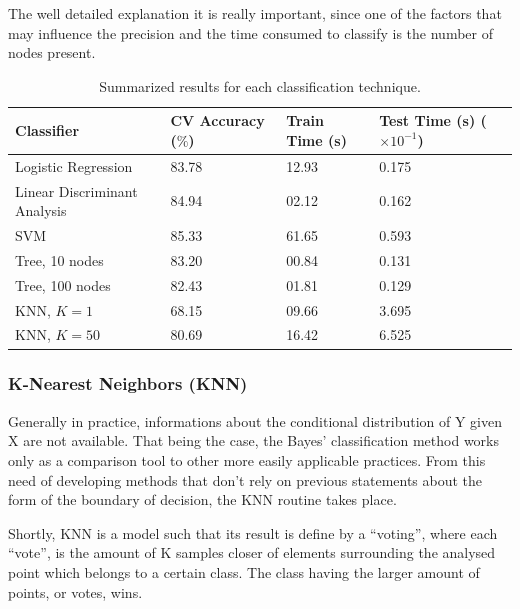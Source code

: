 The well detailed explanation it is really important, since one of the factors that may 
influence the precision and the time consumed to classify is the number of nodes present.

\begin{table}[!htbp]
    \caption{Summarized results for each classification technique.}
    \begin{center}
    \begin{tabular}{|l|l|l|l|l|}
            \hline 
            Classifier & CV Accuracy ($\%$) & Train Time (s) & Test Time (s) ($\times 10^{-1}$)  \\
            \hline
            Logistic Regression & 83.78 & 12.93 & 0.175 \\
            \hline
            Linear Discriminant Analysis & 84.94 & 02.12 & 0.162 \\
            \hline
            SVM & 85.33 & 61.65 & 0.593 \\
            \hline
            Tree, 10 nodes & 83.20 & 00.84 &  0.131 \\
            \hline
            Tree, 100 nodes & 82.43 & 01.81 & 0.129 \\
            \hline
            KNN, $K = 1$ & 68.15 & 09.66 & 3.695 \\
            \hline
            KNN, $K = 50$ & 80.69 & 16.42 & 6.525 \\
            \hline
    \end{tabular}
  \label{tab:results}
  \end{center}
  \end{table}

\subsubsection{K-Nearest Neighbors (KNN)} 
\label{KNN}
Generally in practice, informations about the conditional distribution of Y given X 
are not available. That being the case, the Bayes' classification method works only as 
a comparison tool to other more easily applicable practices. From this need of developing 
methods that don't rely on previous statements about the form of the boundary of decision,
the KNN routine takes place.

Shortly, KNN is a model such that its result is define by a ``voting'', where each ``vote'', 
is the amount of K samples closer of elements surrounding the analysed point which belongs
to a certain class. The class having the larger amount of points, or votes, wins. 

